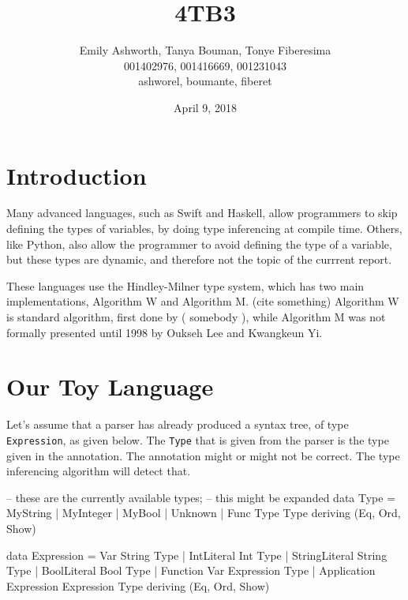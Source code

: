 \documentclass[12pt]{article}
\title{4TB3 }
\author{Emily Ashworth, Tanya Bouman, Tonye Fiberesima \\ 
001402976, 001416669, 001231043 \\ 
ashworel, boumante, fiberet}
\date{April 9, 2018}
\begin{document}
\maketitle

\section{Introduction}

Many advanced languages, such as Swift\cite{swifttypedocs} and Haskell\cite{haskelltypedocs},
allow programmers to skip defining the types of variables,
by doing type inferencing at compile time.
Others, like Python, also allow the programmer to avoid defining
the type of a variable, but these types are dynamic\cite{pythonsummary}, 
and therefore not the topic of the currrent report.

These languages use the Hindley-Milner type system, which has two main implementations, Algorithm W and Algorithm M.  (cite something)  Algorithm W is standard algorithm, first done by ( somebody ), while Algorithm M was not formally presented until 1998 by Oukseh Lee and Kwangkeun Yi\cite{Lee:1998:PFL:291891.291892}.







\section{Our Toy Language}


Let's assume that a parser has already produced a syntax tree, of type
\texttt{Expression}, as given below.
The \texttt{Type} that is given from the parser is the type given in the
annotation.  The annotation might or might not be correct. The type
inferencing algorithm will detect that.
\begin{code}

-- these are the currently available types;
-- this might be expanded
data Type = MyString
          | MyInteger
          | MyBool
          | Unknown
          | Func Type Type
          deriving (Eq, Ord, Show)

data Expression = Var String Type
                | IntLiteral Int Type
                | StringLiteral String Type
                | BoolLiteral Bool Type
                | Function Var Expression Type
                | Application Expression Expression Type
                deriving (Eq, Ord, Show)
\end{code}
\end{document}
